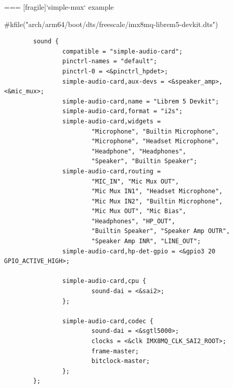 === [fragile]{`simple-mux` example}
  \begin{block}{#kfile("arch/arm64/boot/dts/freescale/imx8mq-librem5-devkit.dts")}
    \fontsize{7}{6}\selectfont
    \begin{verbatim}
        sound {
                compatible = "simple-audio-card";
                pinctrl-names = "default";
                pinctrl-0 = <&pinctrl_hpdet>;
                simple-audio-card,aux-devs = <&speaker_amp>, <&mic_mux>;
                simple-audio-card,name = "Librem 5 Devkit";
                simple-audio-card,format = "i2s";
                simple-audio-card,widgets =
                        "Microphone", "Builtin Microphone",
                        "Microphone", "Headset Microphone",
                        "Headphone", "Headphones",
                        "Speaker", "Builtin Speaker";
                simple-audio-card,routing =
                        "MIC_IN", "Mic Mux OUT",
                        "Mic Mux IN1", "Headset Microphone",
                        "Mic Mux IN2", "Builtin Microphone",
                        "Mic Mux OUT", "Mic Bias",
                        "Headphones", "HP_OUT",
                        "Builtin Speaker", "Speaker Amp OUTR",
                        "Speaker Amp INR", "LINE_OUT";
                simple-audio-card,hp-det-gpio = <&gpio3 20 GPIO_ACTIVE_HIGH>;

                simple-audio-card,cpu {
                        sound-dai = <&sai2>;
                };

                simple-audio-card,codec {
                        sound-dai = <&sgtl5000>;
                        clocks = <&clk IMX8MQ_CLK_SAI2_ROOT>;
                        frame-master;
                        bitclock-master;
                };
        };
    \end{verbatim}
  \end{block}

